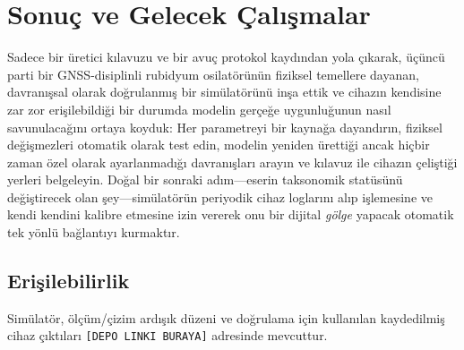 \documentclass[9pt,twocolumn,a4paper]{extarticle}
\begin{document}
\section{Sonuç ve Gelecek Çalışmalar}
Sadece bir üretici kılavuzu ve bir avuç protokol kaydından yola çıkarak, üçüncü parti bir GNSS-disiplinli rubidyum osilatörünün fiziksel temellere dayanan, davranışsal olarak doğrulanmış bir simülatörünü inşa ettik ve cihazın kendisine zar zor erişilebildiği bir durumda modelin gerçeğe uygunluğunun nasıl savunulacağını ortaya koyduk: Her parametreyi bir kaynağa dayandırın, fiziksel değişmezleri otomatik olarak test edin, modelin yeniden ürettiği ancak hiçbir zaman özel olarak ayarlanmadığı davranışları arayın ve kılavuz ile cihazın çeliştiği yerleri belgeleyin. Doğal bir sonraki adım---eserin taksonomik statüsünü değiştirecek olan şey---simülatörün periyodik cihaz loglarını alıp işlemesine ve kendi kendini kalibre etmesine izin vererek onu bir dijital \emph{gölge} yapacak otomatik tek yönlü bağlantıyı kurmaktır.

\subsection*{Erişilebilirlik}
Simülatör, ölçüm/çizim ardışık düzeni ve doğrulama için kullanılan kaydedilmiş cihaz çıktıları
\texttt{[DEPO LINKI BURAYA]} adresinde mevcuttur.

\end{document}
